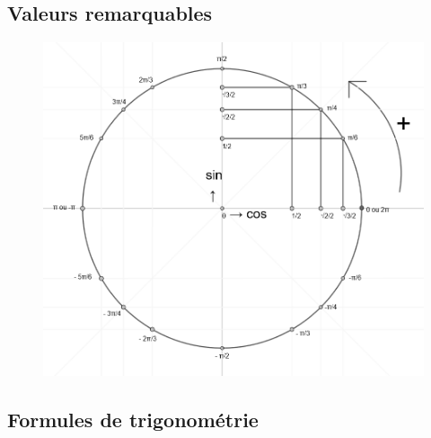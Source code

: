 \documentclass{article}
\begin{document}
\subsection{Valeurs remarquables}
\begin{figure}[htp]
\centering
\includegraphics[scale=0.25]{cercle-trigo-filled}
\caption{}
\label{}
\end{figure}

\subsection{Formules de trigonométrie}

\begin{equation*}
\end{equation*}
\end{document}
